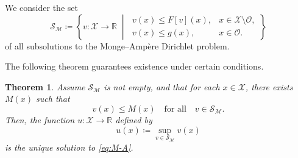 \documentclass[reqno,11pt]{amsart}
\numberwithin{equation}{section}
\newtheorem{theorem}{Theorem}[section]
\theoremstyle{definition}
\theoremstyle{remark}
\begin{document}
\medskip

We consider the set
\[
\mathcal{S}_{\mathcal{M}} \coloneqq
\left\{
v \colon \mathcal{X} \to \mathbb{R}
\;\middle|\;
\begin{array}{ll}
\displaystyle
v(x) \leq F[v](x),
& x \in \mathcal{X} \setminus \mathcal{O},
\\[1.2ex]
v(x) \leq g(x),
& x \in \mathcal{O}.
\end{array}
\right\}
\]
of all subsolutions to the Monge--Amp\`ere Dirichlet problem. 

The following theorem guarantees existence under certain conditions.

\begin{theorem}\label{thm:large-sub}
Assume $\mathcal{S}_{\mathcal{M}}$ is not empty, and that for each $x \in \mathcal{X}$, there exists $M(x)$ such that
\[
    v(x) \leq M(x) \quad \text{for all} \quad v \in \mathcal{S}_{\mathcal{M}}.
\]
Then, the function $u\colon \mathcal{X} \to \mathbb{R}$ defined by
\[
    u(x) \coloneqq \sup_{v \in \mathcal{S}_{\mathcal{M}}}v(x)
\]
is the unique solution to \eqref{eq:M-A}.
\end{theorem}
\end{document}
